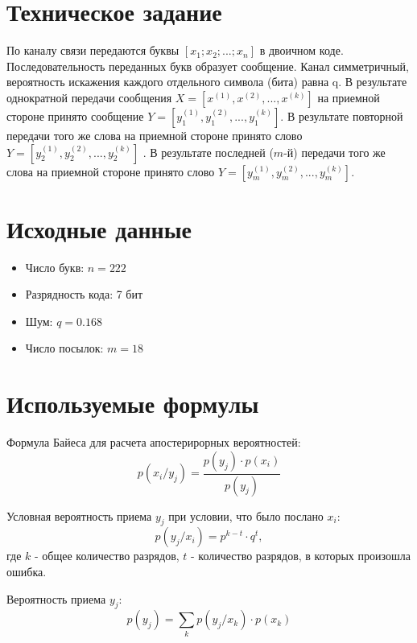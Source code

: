 





\section{Техническое задание}

По каналу связи передаются буквы $[x_1; x_2;...; x_n]$ в двоичном коде. Последовательность переданных букв образует сообщение. Канал симметричный, вероятность искажения каждого отдельного символа (бита) равна q. В результате однократной передачи сообщения $X = [x^{(1)}, x^{(2)}, ..., x^{(k)}]$ на приемной стороне принято сообщение $Y = [y_1^{(1)}, y_1^{(2)}, ..., y_1^{(k)}]$. В результате повторной передачи того же слова на приемной стороне принято слово $Y = [y_2^{(1)}, y_2^{(2)}, ..., y_2^{(k)}]$ . В результате последней ($m$-й) передачи того же слова на приемной стороне принято слово $Y = [y_m^{(1)}, y_m^{(2)}, ..., y_m^{(k)}]$.

\section{Исходные данные}

\begin{itemize}
\item Число букв: $n = 222$
\item Разрядность кода: 7 бит
\item Шум: $q = 0.168$
\item Число посылок: $m = 18$
\end{itemize}

\section{Используемые формулы}

Формула Байеса для расчета апостерирорных вероятностей:
\begin{equation}\label{eq:pxy}
	p(x_i/y_j) = \frac{p(y_j)\cdot p(x_i)}{p(y_j)}
\end{equation}

Условная вероятность приема $y_j$ при условии, что было послано $x_i$:
\begin{equation}\label{eq:pyx}
	p(y_j/x_i) = p^{k-t}\cdot q^t,
\end{equation}
где $k$ - общее количество разрядов, $t$ - количество разрядов, в которых произошла ошибка. 

Вероятность приема $y_j$:
\begin{equation}\label{eq:py}
	p(y_j) = \sum_k p(y_j/x_k)\cdot p(x_k)
\end{equation}

